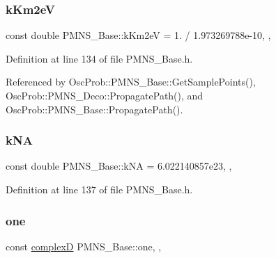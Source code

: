 \subsubsection{\texorpdfstring{k\+Km2eV}{kKm2eV}}
{\footnotesize\ttfamily const double P\+M\+N\+S\+\_\+\+Base\+::k\+Km2eV = 1. / 1.\+973269788e-\/10\hspace{0.3cm}{\ttfamily [static]}, {\ttfamily [protected]}, {\ttfamily [inherited]}}



Definition at line 134 of file P\+M\+N\+S\+\_\+\+Base.\+h.



Referenced by Osc\+Prob\+::\+P\+M\+N\+S\+\_\+\+Base\+::\+Get\+Sample\+Points(), Osc\+Prob\+::\+P\+M\+N\+S\+\_\+\+Deco\+::\+Propagate\+Path(), and Osc\+Prob\+::\+P\+M\+N\+S\+\_\+\+Base\+::\+Propagate\+Path().

\mbox{\label{classOscProb_1_1PMNS__Base_a69355e770b89e99437c2b8a66e48eeb9}} 
\subsubsection{\texorpdfstring{k\+NA}{kNA}}
{\footnotesize\ttfamily const double P\+M\+N\+S\+\_\+\+Base\+::k\+NA = 6.\+022140857e23\hspace{0.3cm}{\ttfamily [static]}, {\ttfamily [protected]}, {\ttfamily [inherited]}}



Definition at line 137 of file P\+M\+N\+S\+\_\+\+Base.\+h.

\mbox{\label{classOscProb_1_1PMNS__Base_a7d1d0bbcab30a1fd8c368c40134c51ff}} 
\subsubsection{\texorpdfstring{one}{one}}
{\footnotesize\ttfamily const \hyperlink{EigenPoint_8h_a67ca8e107e20610c3fff78d5e726ece0}{complexD} P\+M\+N\+S\+\_\+\+Base\+::one\hspace{0.3cm}{\ttfamily [static]}, {\ttfamily [protected]}, {\ttfamily [inherited]}}



